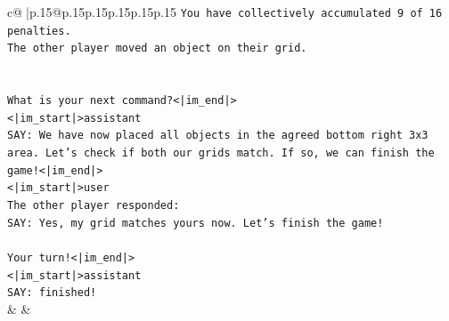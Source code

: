 \documentclass{article}
\begin{document}
{\begin{supertabular}{c@{$\;$}|p{.15\linewidth}@{}p{.15\linewidth}p{.15\linewidth}p{.15\linewidth}p{.15\linewidth}p{.15\linewidth}}
{{{\texttt{You have collectively accumulated 9 of 16 penalties.} \\
\texttt{The other player moved an object on their grid.} \\
\\ 
\\ 
\texttt{What is your next command?<|im\_end|>} \\
\texttt{<|im\_start|>assistant} \\
\texttt{SAY: We have now placed all objects in the agreed bottom right 3x3 area. Let's check if both our grids match. If so, we can finish the game!<|im\_end|>} \\
\texttt{<|im\_start|>user} \\
\texttt{The other player responded:} \\
\texttt{SAY: Yes, my grid matches yours now. Let's finish the game!} \\
\\ 
\texttt{Your turn!<|im\_end|>} \\
\texttt{<|im\_start|>assistant} \\
\texttt{SAY: finished!} \\
            }
        }
    }
    & & \\ \\


\end{supertabular}}
\end{document}
